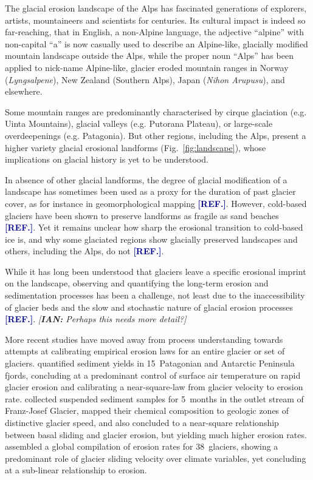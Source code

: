 \documentclass[utf8]{article}
\newcommand{\aref}[0]{\textcolor{darkblue}{\textbf{[REF.]}}}
\newcommand{\ian}[1]{\textcolor{darkbrown}{\emph{[\textbf{IAN:} #1]}}}
\begin{document}
    The glacial erosion landscape of the Alps has fascinated generations of
    explorers, artists, mountaineers and scientists for centuries. Its cultural
    impact is indeed so far-reaching, that in English, a non-Alpine language,
    the adjective ``alpine'' with non-capital ``a'' is now casually used to
    describe an Alpine-like, glacially modified mountain landscape outside the
    Alps, while the proper noun ``Alps'' has been applied to nick-name
    Alpine-like, glacier eroded mountain ranges in Norway (\emph{Lyngsalpene}),
    New Zealand (Southern Alps), Japan (\emph{Nihon Arupusu}), and elsewhere.

    Some mountain ranges are predominantly characterised by cirque glaciation
    (e.g. Uinta Mountains), glacial valleys (e.g. Putorana Plateau), or
    large-scale overdeepenings (e.g. Patagonia). But other regions, including
    the Alps, present a higher variety glacial erosional landforms
    (Fig.~\ref{fig:landscape}), whose implications on glacial history is yet to
    be understood.

    In absence of other glacial landforms, the degree of glacial modification
    of a landscape has sometimes been used as a proxy for the duration of past
    glacier cover, as for instance in geomorphological mapping \aref. However,
    cold-based glaciers have been shown to preserve landforms as fragile as
    sand beaches \aref. Yet it remains unclear how sharp the erosional
    transition to cold-based ice is, and why some glaciated regions show
    glacially preserved landscapes and others, including the Alps, do not
    \aref.

    While it has long been understood that glaciers leave a specific erosional
    imprint on the landscape, observing and quantifying the long-term erosion
    and sedimentation processes has been a challenge, not least due to the
    inaccessibility of glacier beds and the slow and stochastic nature of
    glacial erosion processes \aref. \ian{Perhaps this needs more detail?}

    More recent studies have moved away from process
    understanding towards attempts at calibrating empirical erosion laws for an entire
    glacier or set of glaciers. \citet{Koppes.etal.2015} quantified sediment
    yields in 15~Patagonian and Antarctic Peninsula fjords, concluding at a
    predominant control of surface air temperature on rapid glacier erosion and
    calibrating a near-square-law from glacier velocity to erosion rate.
    \citet{Herman.etal.2015} collected suspended sediment samples for 5~months
    in the outlet stream of Franz-Josef Glacier, mapped their chemical
    composition to geologic zones of distinctive glacier speed, and also
    concluded to a near-square relationship between basal sliding and glacier
    erosion, but yielding much higher erosion rates.
    \citet{Cook.etal.2020} assembled a global compilation of erosion rates for
    38~glaciers, showing a predominant role of glacier sliding velocity over
    climate variables, yet concluding at a sub-linear relationship to erosion.
\end{document}
